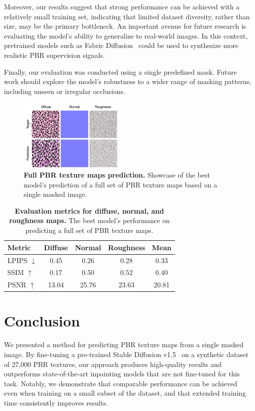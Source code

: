 \documentclass[11pt,twocolumn]{article}
\begin{document}
Moreover, our results suggest that strong performance can be achieved with a relatively small training set, 
indicating that limited dataset diversity, rather than size, may be the primary bottleneck. 
An important avenue for future research is evaluating the model's ability to generalize to real-world images. In this context, pretrained models such as Fabric Diffusion~\cite{fabricdiffusion} could be used to synthesize more realistic PBR supervision signals.

Finally, our evaluation was conducted using a single predefined mask. Future work should explore the 
model's robustness to a wider range of masking patterns, including unseen or irregular occlusions.


\begin{figure}[t]
  \centering
  \includegraphics[width=0.45\textwidth]{figures/full_pbr_showcase.png}
  \caption{\textbf{Full PBR texture maps prediction.} Showcase of the best model's prediction of a full set of PBR texture maps 
  based on a single masked image.}
  \label{fig:full-pbr-showcase}
\end{figure}

\begin{table}[t]
  \centering
  \begin{tabular}{l | ccc | c}
    \toprule
    \textbf{Metric} & \textbf{Diffuse} & \textbf{Normal} & \textbf{Roughness} & \textbf{Mean} \\
    \midrule
    LPIPS $\downarrow$ & 0.45 & 0.26 & 0.28 & 0.33 \\
    SSIM $\uparrow$ & 0.17 & 0.50 & 0.52 & 0.40 \\
    PSNR $\uparrow$ & 13.04 & 25.76 & 23.63 & 20.81 \\
    \bottomrule
    \end{tabular}
  \caption{\textbf{Evaluation metrics for diffuse, normal, and roughness maps.} 
  The best model's performance on predicting a full set of PBR texture maps.}
  \label{tab:full-pbr-metrics}
\end{table}


\section{Conclusion}
We presented a method for predicting PBR texture maps from a single masked image. 
By fine-tuning a pre-trained Stable Diffusion v1.5~\cite{sd} on a synthetic dataset of 
27,000 PBR textures, our approach produces high-quality results and outperforms state-of-the-art 
inpainting models that are not fine-tuned for this task. Notably, we demonstrate that comparable 
performance can be achieved even when training on a small subset of the dataset, and that 
extended training time consistently improves results.
\end{document}
